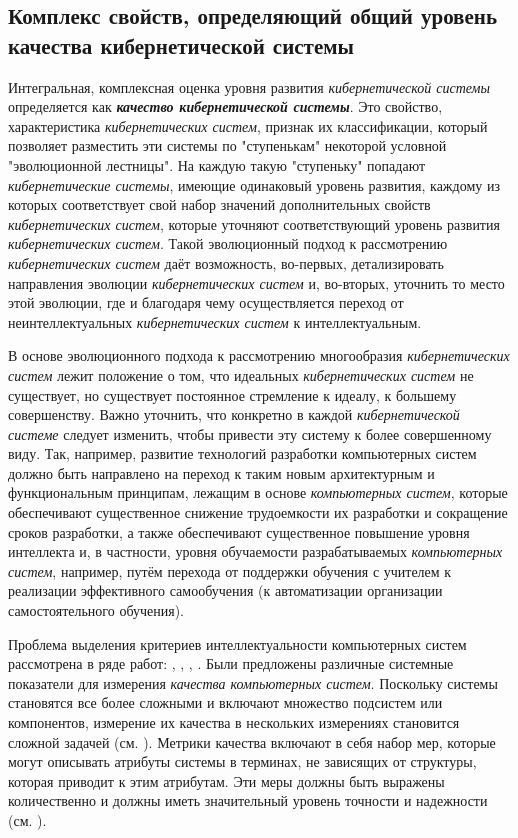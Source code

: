 \subsection{Комплекс свойств, определяющий общий уровень качества кибернетической системы}
{\label{sec_cyb_syst_overall_quality}} 

Интегральная, комплексная оценка уровня развития \textit{кибернетической системы} определяется как \textbf{\textit{качество кибернетической системы}}. Это свойство, характеристика \textit{кибернетических систем}, признак их классификации, который позволяет разместить эти системы по "ступенькам"{} некоторой условной "эволюционной лестницы"{}.
На каждую такую "ступеньку"{} попадают \textit{кибернетические системы}, имеющие одинаковый уровень развития, каждому из которых соответствует свой набор значений дополнительных свойств \textit{кибернетических систем}, которые уточняют соответствующий уровень развития \textit{кибернетических систем}. Такой эволюционный подход к рассмотрению \textit{кибернетических систем} даёт возможность, во-первых, детализировать направления эволюции \textit{кибернетических систем} и, во-вторых, уточнить то место этой эволюции, где и благодаря чему осуществляется переход от неинтеллектуальных \textit{кибернетических систем} к интеллектуальным.

В основе эволюционного подхода к рассмотрению многообразия \textit{кибернетических систем} лежит положение о том, что идеальных \textit{кибернетических систем} не существует, но существует постоянное стремление к идеалу, к большему совершенству. 
Важно уточнить, что конкретно в каждой \textit{кибернетической системе} следует изменить, чтобы привести эту систему к более совершенному виду. Так, например, развитие технологий разработки компьютерных систем должно быть направлено на переход к таким новым архитектурным и функциональным принципам, лежащим в основе \textit{компьютерных систем}, которые обеспечивают существенное снижение трудоемкости их разработки и сокращение сроков разработки, а также обеспечивают существенное повышение уровня интеллекта и, в частности, уровня обучаемости разрабатываемых \textit{компьютерных систем}, например, путём перехода от поддержки обучения с учителем к реализации эффективного самообучения (к автоматизации организации самостоятельного обучения). 

Проблема выделения критериев интеллектуальности компьютерных систем рассмотрена в ряде работ: , , , . Были предложены различные системные показатели для измерения \textit{качества компьютерных систем}. Поскольку системы становятся все более сложными и включают множество подсистем или компонентов, измерение их качества в нескольких измерениях становится сложной задачей (см. ). Метрики качества включают в себя набор мер, которые могут описывать атрибуты системы в терминах, не зависящих от структуры, которая приводит к этим атрибутам. Эти меры должны быть выражены количественно и должны иметь значительный уровень точности и надежности (см. ). 

